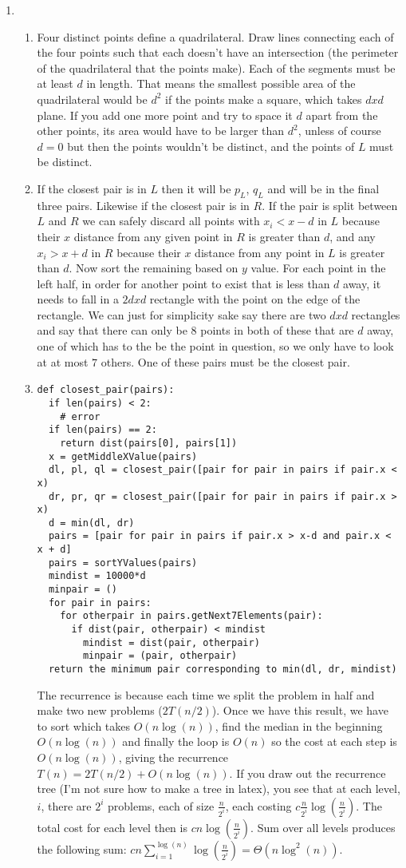 \documentclass[11pt]{article}
\begin{document}
\begin{enumerate}
\newpage
\item
\begin{enumerate}
\item Four distinct points define a quadrilateral. Draw lines connecting each of the four points such that each doesn't have an intersection (the perimeter of the quadrilateral that the points make). Each of the segments must be at least $d$ in length. That means the smallest possible area of the quadrilateral would be $d^2$ if the points make a square, which takes $d x d$ plane. If you add one more point and try to space it $d$ apart from the other points, its area would have to be larger than $d^2$, unless of course $d=0$ but then the points wouldn't be distinct, and the points of $L$ must be distinct.
\item If the closest pair is in $L$ then it will be $p_L$, $q_L$ and will be in the final three pairs. Likewise if the closest pair is in $R$. If the pair is split between $L$ and $R$ we can safely discard all points with $x_i<x-d$ in $L$ because their $x$ distance from any given point in $R$ is greater than $d$, and any $x_i>x+d$ in $R$ because their $x$ distance from any point in $L$ is greater than $d$. Now sort the remaining based on $y$ value. For each point in the left half, in order for another point to exist that is less than $d$ away, it needs to fall in a $2d x d$ rectangle with the point on the edge of the rectangle. We can just for simplicity sake say there are two $d x d$ rectangles and say that there can only be $8$ points in both of these that are $d$ away, one of which has to the be the point in question, so we only have to look at at most $7$ others. One of these pairs must be the closest pair.
\item
\begin{verbatim} 
def closest_pair(pairs):
  if len(pairs) < 2:
    # error
  if len(pairs) == 2:
    return dist(pairs[0], pairs[1])
  x = getMiddleXValue(pairs)
  dl, pl, ql = closest_pair([pair for pair in pairs if pair.x < x)
  dr, pr, qr = closest_pair([pair for pair in pairs if pair.x > x)
  d = min(dl, dr)
  pairs = [pair for pair in pairs if pair.x > x-d and pair.x < x + d]
  pairs = sortYValues(pairs)
  mindist = 10000*d
  minpair = ()
  for pair in pairs:
    for otherpair in pairs.getNext7Elements(pair):
      if dist(pair, otherpair) < mindist
        mindist = dist(pair, otherpair)
        minpair = (pair, otherpair)
  return the minimum pair corresponding to min(dl, dr, mindist)
\end{verbatim}
The recurrence is because each time we split the problem in half and make two new problems ($2T(n/2)$). Once we have this result, we have to sort which takes $O(n\log(n))$, find the median in the beginning $O(n\log(n))$ and finally the loop is $O(n)$ so the cost at each step is $O(n\log(n))$, giving the recurrence $T(n)=2T(n/2)+O(n\log(n))$. If you draw out the recurrence tree (I'm not sure how to make a tree in latex), you see that at each level, $i$, there are $2^i$ problems, each of size $\frac{n}{2^i}$, each costing $c\frac{n}{2^i}\log(\frac{n}{2^i})$. The total cost for each level then is $cn\log(\frac{n}{2^i})$. Sum over all levels produces the following sum: $cn\sum_{i=1}^{\log(n)}\log(\frac{n}{2^i})=\Theta(n\log^2(n))$.

\end{enumerate}
\end{enumerate}
\end{document}
